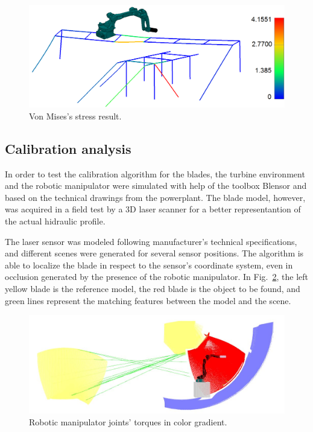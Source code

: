 \begin{figure}
	\centering
	\includegraphics[width=.95\columnwidth]{figs/mecanica/von_mises.png}
    \caption{Von Mises's stress result.}
    \label{fig:von_mises}
\end{figure}

\subsection{Calibration analysis}

In order to test the calibration algorithm for the blades, the turbine
environment and the robotic manipulator were simulated with help of the toolbox
Blensor \cite{Gschwandtner11b} and based on the technical drawings from the
powerplant. The blade model, however, was acquired in a field test by a 3D laser
scanner for a better representantion of the actual hidraulic profile.

The laser sensor was modeled following manufacturer's technical
specifications, and different scenes were generated for several sensor
positions. The algorithm is able to localize the blade in respect to the
sensor's coordinate system, even in occlusion generated by the presence of the
robotic manipulator. In Fig.~\ref{fig:calibration}, the left yellow blade is the
reference model, the red blade is the object to be found, and green lines
represent the matching features between the model and the scene.

\begin{figure}
	\centering
	\includegraphics[width=.95\columnwidth]{figs/results/sim_mh12_sp}
    \caption{Robotic manipulator joints' torques in color gradient.}
    \label{fig:calibration}
\end{figure}

